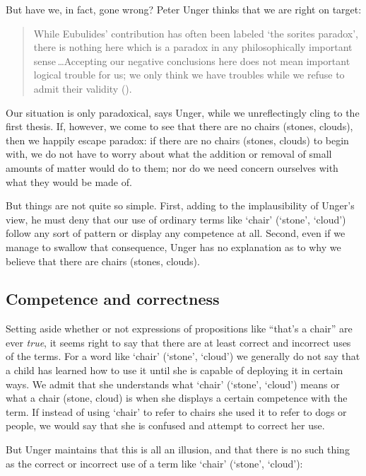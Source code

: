 \documentclass[11pt]{standalone} \newif\ifstandlone \standalonetrue
\newenvironment{squote}{%
	\begin{quote}\begin{singlespace}%
	}{%
	\end{singlespace}\end{quote}}
\begin{document}
\begin{spacing}{1.5}
But have we, in fact, gone wrong?  Peter Unger thinks that we are
right on target:

\begin{squote}
While Eubulides' contribution has often been labeled `the sorites
paradox', there is nothing here which is a paradox in any
philosophically important sense\,\ldots Accepting our negative
conclusions here does not mean important logical trouble for us; we
only think we have troubles while we refuse to admit their validity
(\citeyear[145]{unger1979}).
\end{squote}

Our situation is only paradoxical, says Unger, while we unreflectingly
cling to the first thesis.  If, however, we come to see that there are
no chairs (stones, clouds), then we happily escape paradox: if there
are no chairs (stones, clouds) to begin with, we do not have to worry
about what the addition or removal of small amounts of matter would do
to them; nor do we need concern ourselves with what they would be made
of.

But things are not quite so simple.  First, adding to the
implausibility of Unger's view, he must deny that our use of ordinary
terms like `chair' (`stone', `cloud') follow any sort of pattern or
display any competence at all.  Second, even if we manage to swallow
that consequence, Unger has no explanation as to why we believe that
there are chairs (stones, clouds).

\subsection{Competence and correctness}
\label{comp}
Setting aside whether or not expressions of propositions like ``that's
a chair'' are ever \emph{true}, it seems right to say that there are
at least correct and incorrect uses of the terms.  For a word like
`chair' (`stone', `cloud') we generally do not say that a child has
learned how to use it until she is capable of deploying it in certain
ways.  We admit that she understands what `chair' (`stone', `cloud')
means or what a chair (stone, cloud) is when she displays a certain
competence with the term.  If instead of using `chair' to refer to
chairs she used it to refer to dogs or people, we would say that she
is confused and attempt to correct her use.

But Unger maintains that this is all an illusion, and that there is no
such thing as the correct or incorrect use of a term like `chair'
(`stone', `cloud'):


\end{spacing}
\end{document}
